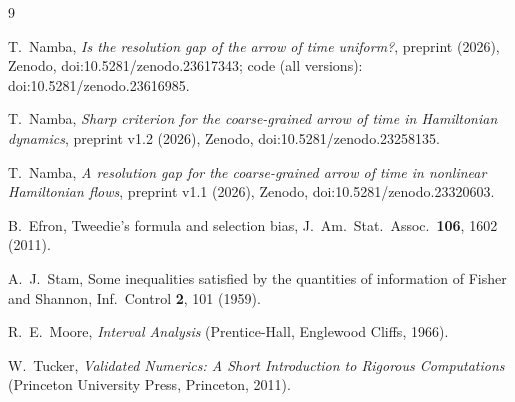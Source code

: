 \begin{thebibliography}{9}

T.~Namba, \emph{Is the resolution gap of the arrow of time uniform?}, preprint (2026), Zenodo, doi:10.5281/zenodo.23617343;
code (all versions): doi:10.5281/zenodo.23616985.

T.~Namba, \emph{Sharp criterion for the coarse-grained arrow of time in Hamiltonian dynamics}, preprint v1.2 (2026), Zenodo,
doi:10.5281/zenodo.23258135.

T.~Namba, \emph{A resolution gap for the coarse-grained arrow of time in nonlinear Hamiltonian flows}, preprint v1.1 (2026), Zenodo,
doi:10.5281/zenodo.23320603.

B.~Efron, Tweedie's formula and selection bias, J.~Am.\ Stat.\ Assoc.\ \textbf{106}, 1602 (2011).

A.~J.~Stam, Some inequalities satisfied by the quantities of information of Fisher and Shannon, Inf.\ Control \textbf{2}, 101 (1959).

R.~E.~Moore, \emph{Interval Analysis} (Prentice-Hall, Englewood Cliffs, 1966).

W.~Tucker, \emph{Validated Numerics: A Short Introduction to Rigorous Computations} (Princeton University Press, Princeton, 2011).

\end{thebibliography}
